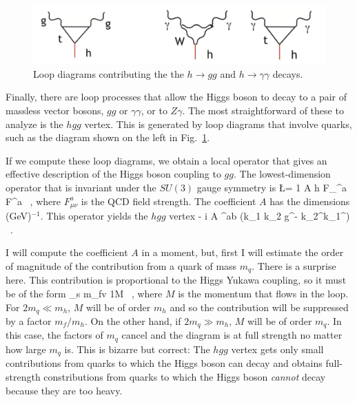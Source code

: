\documentclass[12pt]{article}
\begin{document}
\begin{figure}
\begin{center}
\includegraphics[width=0.70\hsize]{toploop.pdf}
\end{center}
\caption{Loop diagrams contributing the the $h\to gg$ and $h\to
  \gamma\gamma$ decays.}
\label{fig:toploop}
\end{figure}



Finally, there are loop processes that allow the Higgs boson to decay
to a pair of massless vector bosons, $gg$ or $\gamma\gamma$, or to
$Z\gamma$.    The most straightforward of these to analyze is the
$hgg$ vertex.  This is generated by loop diagrams that involve quarks,
such as the diagram shown on the left in Fig.~\ref{fig:toploop}.

If we compute these loop diagrams, we obtain a local operator that
gives an effective description of the Higgs boson coupling to $gg$.
The lowest-dimension operator that is invariant under the $SU(3)$ gauge
symmetry is 
\beq 
      \Delta \L =    {1} A h  F_{\mu\nu}^a F^{\mu\nu a} \ , 
where $F_{\mu\nu}^a$ is the QCD field strength.   The coefficient $A$
has the dimensions  (GeV)$^{-1}$.  This operator yields the $hgg$
vertex
\beq
      - i A \delta^{ab} (k_1 \cdot k_2 g^{\mu\nu}-
      k_2^\mu k_1^\nu ) \ . 

I will compute the coefficient $A$ in a moment, but, first I will
estimate the order of magnitude of the contribution from a quark of
mass $m_q$.   There is a surprise here.   This contribution is
proportional to the Higgs Yukawa coupling, so it must be of the form
\beq
                   \alpha_s {m_f\over v}  {1\over M} \ , 
where $M$ is the momentum that flows in the loop.   For $2m_q \ll m_h$,
$M$ will be of order $m_h$ and so the contribution 
will be suppressed by a factor $m_f/m_h$.  On the other hand, if 
$2m_q \gg m_h$, $M$ will be of order $m_q$.  In this case, the factors
of $m_q$ cancel and the diagram is at full strength no matter how
large $m_q$ is.   This is bizarre but correct:   The $hgg$ vertex gets
only small contributions from quarks to which the Higgs boson can
decay and obtains full-strength constributions  from quarks to which the Higgs
boson {\it cannot} decay because they are too heavy.
\end{document}
